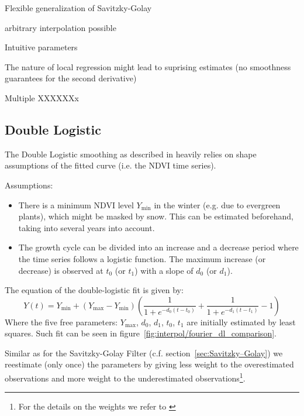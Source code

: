 \begin{my_pros_cons_table}{
    \item Flexible generalization of Savitzky-Golay
    \item arbitrary interpolation possible
    \item Intuitive parameters
  }{
    \item The nature of local regression might lead to suprising estimates (no smoothness guarantees for the second derivative)
    \item Multiple XXXXXXx
  }
\end{my_pros_cons_table}

\subsection{Double Logistic}
\label{sec:double_logistic}
The Double Logistic smoothing as described in \cite{beckImprovedMonitoringVegetation2006} heavily relies on shape assumptions of the fitted curve (i.e. the NDVI time series).

Assumptions:
\begin{itemize}
  \item There is a minimum NDVI level $Y_{\min}$ in the winter (e.g. due to evergreen plants), which might be masked by snow. This can be estimated beforehand, taking into several years into account.
  \item The growth cycle can be divided into an increase and a decrease period where the time series follows a logistic function. The maximum increase (or decrease) is observed at $t_0$ (or $t_1$) with a slope of $d_0$ (or $d_1$).
\end{itemize}

The equation of the double-logistic fit is given by:
\begin{equation*}
  Y(t) = Y_{\min} + \left(Y_{\max}-Y_{\min}\right)\left(\frac{1}{1+e^{-d_0(t-t_0)}}+\frac{1}{1+e^{-d_1(t-t_1)}}-1\right)
\end{equation*}
Where the five free parameters: $Y_{\max}$, $d_0$, $d_1$, $t_0$, $t_1$ are initially estimated by least squares. Such fit can be seen in figure~\ref{fig:interpol/fourier_dl_comparison}.

Similar as for the Savitzky-Golay Filter (c.f. section~\ref{sec:Savitzky–Golay}) we reestimate (only once) the parameters by giving less weight to the overestimated observations and more weight to the underestimated observations\footnote{For the details on the weights we refer to \cite{beckImprovedMonitoringVegetation2006}}.

